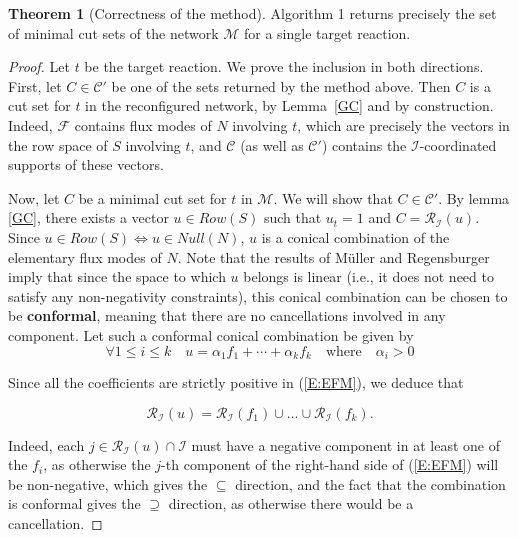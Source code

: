 \documentclass{bioinfo}
\theoremstyle{plain}
\theoremstyle{definition}
\newtheorem{theorem}{Theorem} %
\begin{document}
\begin{theorem} [Correctness of the method] 
Algorithm 1 returns precisely the set of minimal cut sets of
the network $\mathcal{M}$ for a single target reaction.
\end{theorem}
\begin{proof} %
Let $t$ be the target reaction. We prove the inclusion in both directions. First, let $C \in \mathcal{C'}$ be one of the sets returned by the method above. Then $C$ is a cut set for $t$ in the reconfigured network, by Lemma~\ref{GC} and by construction. Indeed, $\mathcal{F}$ contains flux modes of $N$ involving $t$, which are precisely the vectors in the row space of $S$ involving $t$, and $\mathcal{C}$ (as well as $\mathcal{C'}$) contains the $\mathcal{I}$-coordinated supports of these vectors.

Now, let $C$ be a minimal cut set for $t$ in $\mathcal{M}$. We will show that $C \in \mathcal{C'}$. By lemma \ref{GC}, there exists a vector $u \in Row(S)$ such that $u_t = 1$ and $C = \mathcal{R}_{\mathcal{I}}(u)$. Since $u \in Row(S) \iff u \in Null(N)$, $u$ is a conical combination of the elementary flux modes of $N$. Note that the results of M\"{u}ller and Regensburger \cite{Conformal} imply that since the space to which $u$ belongs is linear (i.e., it does not need to satisfy any non-negativity constraints), this conical combination can be chosen to be \textbf{conformal}, meaning that there are no cancellations involved in any component. Let such a conformal conical combination be given by
\begin{equation} \label{E:EFM}
 \forall 1 \le i \le k \quad u = \alpha_1 f_1 + \cdots + \alpha_k f_k \quad \text{where} \quad \alpha_i > 0  
\end{equation}


Since all the coefficients are strictly positive in (\ref{E:EFM}), we deduce that

\[
\mathcal{R}_{\mathcal{I}}(u) = \mathcal{R}_{\mathcal{I}}(f_1) \cup \dots \cup \mathcal{R}_{\mathcal{I}}(f_k).
\]

Indeed, each $j \in \mathcal{R}_{\mathcal{I}}(u) \cap \mathcal{I}$ must have a negative component in at least one of the $f_i$, as otherwise the $j$-th component of the right-hand side of (\ref{E:EFM}) will be non-negative, which gives the $\subseteq$ direction, and the fact that the combination is conformal gives the $\supseteq$ direction, as otherwise there would be a cancellation.


\end{proof}
\end{document}
